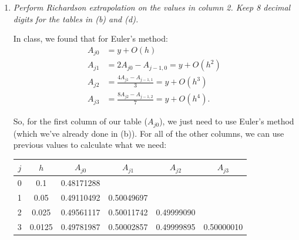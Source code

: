 \begin{enumerate}[label=(\alph*)]
      Multiply both sides of the differential equation by the integrating factor:
      \begin{equation*}
        (t+1)^{2}E'(t) + 2(t+1)E(t) = -\frac{1}{t+1}.
      \end{equation*}

      Notice that the left-hand-side is just the time derivative of $E(t)(t+1)^{2}$, so we can write:
      \begin{equation*}
        \dv{t} \left[E(t)(t+1)^{2}\right] = -\frac{1}{t+1}.
      \end{equation*}

      If we integrate, we get that:
      \begin{equation*}
        E(t)(t+1)^{2} = -\ln{(t+1)} \;\Rightarrow\; \boxed{E(t) = -\frac{\ln{(t+1)}}{(t+1)^{2}}.}
      \end{equation*}

      Therefore, $E(1)$ is:
      \begin{equation*}
        E(1) = -\frac{\ln{(2)}}{(2)^{2}} \approx \boxed{-0.17329.}
      \end{equation*}

    \item \textit{Perform Richardson extrapolation on the values in column 2. Keep 8 decimal digits for the tables in (b) and (d).}

      In class, we found that for Euler's method:
      \begin{align*}
          A_{j0} &= y+O(h) \\
          A_{j1} &= 2A_{j0} - A_{j-1,0} = y+O(h^{2}) \\
          A_{j2} &= \frac{4A_{j1} - A_{j-1,1}}{3} = y+O(h^{3}) \\
          A_{j3} &= \frac{8A_{j2}-A_{j-1,2}}{7} = y+O(h^{4}).
      \end{align*}

      So, for the first column of our table ($A_{j0}$), we just need to use Euler's method (which we've already done in (b)). For all of the other columns, we can use previous values to calculate what we need:
      \begin{table}[h!]
      \centering
      \begin{tabular}{|c|c|c|c|c|c|}
        \hline
        \rule{0pt}{3ex}$j$ & $h$ & $A_{j0}$ & $A_{j1}$ & $A_{j2}$ & $A_{j3}$ \\
        \hline
        0 & 0.1    & 0.48171288 &  &  &  \\
        1 & 0.05   & 0.49110492 & 0.50049697 &  &  \\
        2 & 0.025  & 0.49561117 & 0.50011742 & 0.49999090 &  \\
        3 & 0.0125 & 0.49781987 & 0.50002857 & 0.49999895 & 0.50000010 \\
        \hline
      \end{tabular}
    \end{table}

\end{enumerate}

